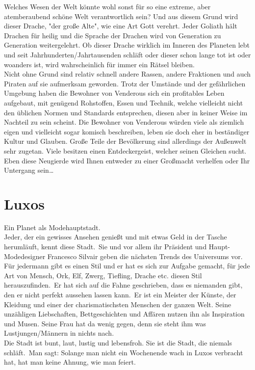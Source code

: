 \documentclass{book}
\begin{document}
Welches Wesen der Welt könnte wohl sonst für so eine extreme, aber atemberaubend schöne Welt verantwortlich sein?
Und aus diesem Grund wird dieser Drache, "der große Alte", wie eine Art Gott verehrt. Jeder Goliath hält Drachen für heilig und die Sprache der Drachen wird von Generation zu Generation weitergelehrt. Ob dieser Drache wirklich im Inneren des Planeten lebt und seit Jahrhunderten/Jahrtausenden schläft oder dieser schon lange tot ist oder woanders ist, wird wahrscheinlich für immer ein Rätsel bleiben.\\
Nicht ohne Grund sind relativ schnell andere Rassen, andere Fraktionen und auch Piraten auf sie aufmerksam geworden. Trotz der Umstände und der gefährlichen Umgebung haben die Bewohner von Venderous sich ein profitables Leben aufgebaut, mit genügend Rohstoffen, Essen und Technik, welche vielleicht nicht den üblichen Normen und Standards entsprechen, diesen aber in keiner Weise im Nachteil zu sein scheint. Die Bewohner von Venderous würden viele als ziemlich eigen und vielleicht sogar komisch beschreiben, leben sie doch eher in beständiger Kultur und Glauben. Große Teile der Bevölkerung sind allerdings der Außenwelt sehr zugetan. Viele besitzen einen Entdeckergeist, welcher seinen Gleichen sucht. Eben diese Neugierde wird Ihnen entweder zu einer Großmacht verhelfen oder Ihr Untergang sein\dots\\

\section{Luxos}
Ein Planet als Modehauptstadt.\\
Jeder, der ein gewisses Ansehen genießt und mit etwas Geld in der Tasche herumläuft, kennt diese Stadt. Sie und vor allem ihr Präsident und Haupt-Modedesigner Francesco Silvair geben die nächsten Trends des Universums vor. Für jedermann gibt es einen Stil und er hat es sich zur Aufgabe gemacht, für jede Art von Mensch, Ork, Elf, Zwerg, Tiefling, Drache etc. diesen Stil herauszufinden. Er hat sich auf die Fahne geschrieben, dass es niemanden gibt, den er nicht perfekt aussehen lassen kann. Er ist ein Meister der Künste, der Kleidung und einer der charismatischsten Menschen der ganzen Welt. Seine unzähligen Liebschaften, Bettgeschichten und Affären nutzen ihn als Inspiration und Musen. Seine Frau hat da wenig gegen, denn sie steht ihm was Lustjungen/Männern in nichts nach.\\
Die Stadt ist bunt, laut, lustig und lebensfroh. Sie ist die Stadt, die niemals schläft. Man sagt: Solange man nicht ein Wochenende wach in Luxos verbracht hat, hat man keine Ahnung, wie man feiert.
\end{document}
